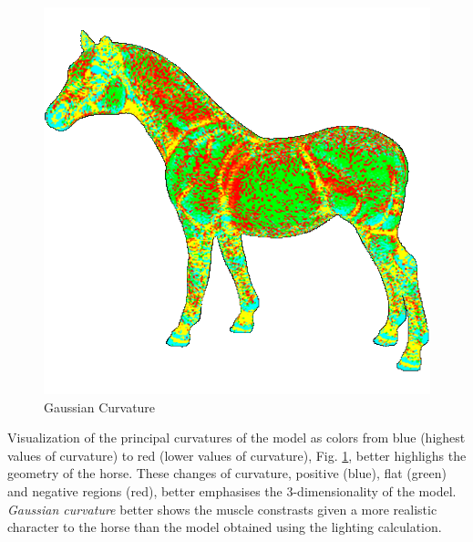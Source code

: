 \begin{figure}[!htb]
    \includegraphics[width=\linewidth]{images/gaussian-horse.png}
    \caption{Gaussian Curvature}\label{fig:gaussian-horse}
  \endminipage
  \end{figure}

Visualization of the principal curvatures of the model as colors from blue (highest values of curvature) to red (lower values of curvature), Fig. \ref{fig:gaussian-horse}, better highlighs the geometry of the horse.
These changes of curvature, positive (blue), flat (green) and negative regions (red), better emphasises the 3-dimensionality of the model. \textit{Gaussian curvature} better shows the muscle constrasts given a more realistic character to the horse than the model obtained using the lighting calculation.

